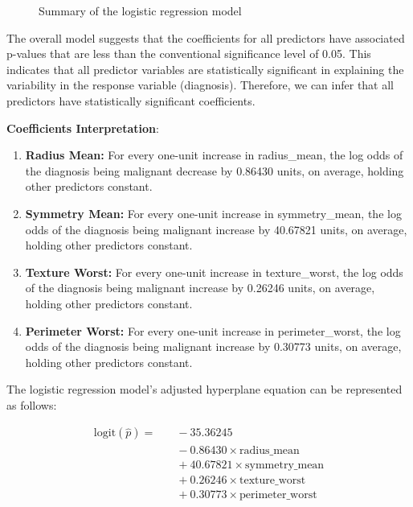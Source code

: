 \documentclass[conference]{IEEEtran}
\begin{document}
\begin{figure}[!h]
      \centering
       {}
      \caption{Summary of the logistic regression model}
\end{figure}

\vspace{0.5cm}

The overall model suggests that the coefficients for all predictors have associated p-values that are less than the conventional significance level of 0.05. This indicates that all predictor variables are statistically significant in explaining the variability in the response variable (diagnosis). Therefore, we can infer that all predictors have statistically significant coefficients.

\vspace{0.5cm}

\textbf{Coefficients Interpretation}:
\begin{enumerate}
\item \textbf{Radius Mean:} For every one-unit increase in radius\_mean, the log odds of the diagnosis being malignant decrease by 0.86430 units, on average, holding other predictors constant.

\item \textbf{Symmetry Mean:} For every one-unit increase in symmetry\_mean, the log odds of the diagnosis being malignant increase by 40.67821 units, on average, holding other predictors constant.

\item \textbf{Texture Worst:}  For every one-unit increase in texture\_worst, the log odds of the diagnosis being malignant increase by 0.26246 units, on average, holding other predictors constant.

\item \textbf{Perimeter Worst:} For every one-unit increase in perimeter\_worst, the log odds of the diagnosis being malignant increase by 0.30773 units, on average, holding other predictors constant.

\end{enumerate}

\vspace{0.5cm}

The logistic regression model's adjusted hyperplane equation can be represented as follows:

\begin{equation}
\begin{aligned}
\text{logit}(\hat{p}) = &\quad -35.36245 \\
&\quad - 0.86430 \times \text{radius\_mean} \\
&\quad + 40.67821 \times \text{symmetry\_mean} \\
&\quad + 0.26246 \times \text{texture\_worst} \\
&\quad + 0.30773 \times \text{perimeter\_worst}
\end{aligned}
\end{equation}
\end{document}
